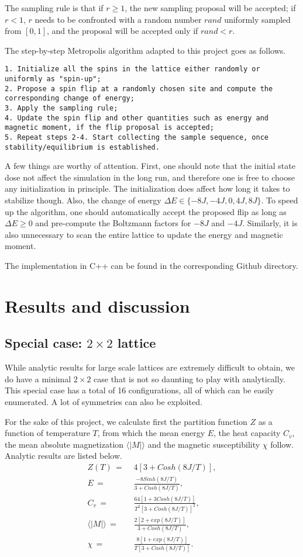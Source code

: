 \documentclass{article}
\begin{document}
The sampling rule is that if $r \ge 1$, the new sampling proposal will be accepted; if $r < 1$, $r$ needs to be confronted with a random number $rand$ uniformly sampled from $[0, 1]$, and the proposal will be accepted only if $rand < r$.

The step-by-step Metropolis algorithm adapted to this project goes as follows.
\begin{Verbatim}[frame=single]
1. Initialize all the spins in the lattice either randomly or 
uniformly as "spin-up";
2. Propose a spin flip at a randomly chosen site and compute the 
corresponding change of energy;
3. Apply the sampling rule;
4. Update the spin flip and other quantities such as energy and 
magnetic moment, if the flip proposal is accepted;
5. Repeat steps 2-4. Start collecting the sample sequence, once 
stability/equilibrium is established.
\end{Verbatim}

A few things are worthy of attention. First, one should note that the initial state dose not 
affect the simulation in the long run, and therefore one is free to choose any initialization in principle. The initialization does affect how long it takes to stabilize though. Also, the change of energy $\Delta E \in \{-8J, -4J, 0, 4J, 8J\}$. To speed up the algorithm, one should automatically accept the proposed flip as long as $\Delta E \ge 0$ and pre-compute the Boltzmann factors for $-8J$ and $-4J$. Similarly, it is also unnecessary to scan the entire lattice to update the energy and magnetic moment. 

The implementation in C++ can be found in the corresponding Github directory.

\section{Results and discussion}

\subsection{Special case: $2\times2$ lattice}
While analytic results for large scale lattices are extremely difficult to obtain, we do have a minimal $2\times2$ case that is not so daunting to play with analytically. This special case has a total of 16 configurations, all of which can be easily enumerated. A lot of symmetries can also be exploited. 

For the sake of this project, we calculate first the partition function $Z$ as a function of temperature $T$, from which the mean energy $E$, the heat capacity $C_v$, the mean absolute magnetization  $\langle|M|\rangle$ and the magnetic susceptibility $\chi$ follow. Analytic results are listed below.
\begin{align}
\label{}
Z(T)\, =&\,\, 4[3+Cosh(8J/T)], \\
E\, =&\,\, \frac{-8Sinh(8J/T)}{3+Cosh(8J/T)}, \\
C_v\, =&\,\, \frac{64[1+3Cosh(8J/T)]}{T^2 [3+Cosh(8J/T)]^2}, \\
 \langle|M|\rangle\, =&\,\, \frac{2[2+exp(8J/T)]}{3+Cosh(8J/T)}, \\
\chi\, =&\,\, \frac{8[1+exp(8J/T)]}{T[3+Cosh(8J/T)]}.
\end{align}
\end{document}

